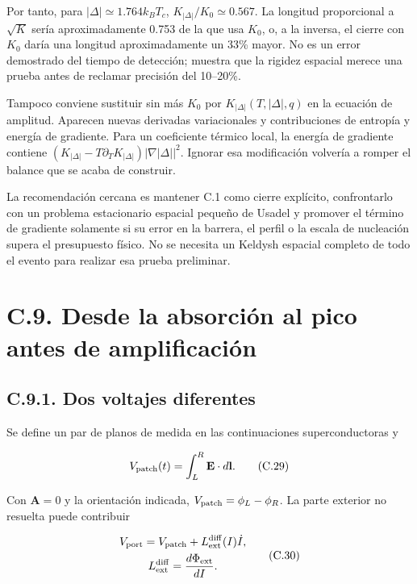 \documentclass[
  spanish,
  10pt,
  a4paper,
]{article}
\begin{document}
Por tanto, para \(|\Delta|\simeq1.764k_BT_c\),
\(K_{|\Delta|}/K_0\simeq0.567\). La longitud proporcional a \(\sqrt K\)
sería aproximadamente 0.753 de la que usa \(K_0\), o, a la inversa, el
cierre con \(K_0\) daría una longitud aproximadamente un 33\% mayor. No
es un error demostrado del tiempo de detección; muestra que la rigidez
espacial merece una prueba antes de reclamar precisión del 10--20\%.

Tampoco conviene sustituir sin más \(K_0\) por
\(K_{|\Delta|}(T,|\Delta|,q)\) en la ecuación de amplitud. Aparecen
nuevas derivadas variacionales y contribuciones de entropía y energía de
gradiente. Para un coeficiente térmico local, la energía de gradiente
contiene \((K_{|\Delta|}-T\partial_TK_{|\Delta|})|\nabla |\Delta||^2\).
Ignorar esa modificación volvería a romper el balance que se acaba de
construir.

La recomendación cercana es mantener C.1 como cierre explícito,
confrontarlo con un problema estacionario espacial pequeño de Usadel y
promover el término de gradiente solamente si su error en la barrera, el
perfil o la escala de nucleación supera el presupuesto físico. No se
necesita un Keldysh espacial completo de todo el evento para realizar
esa prueba preliminar.

\section{C.9. Desde la absorción al pico antes de
amplificación}\label{c.9.-desde-la-absorciuxf3n-al-pico-antes-de-amplificaciuxf3n}

\subsection{C.9.1. Dos voltajes
diferentes}\label{c.9.1.-dos-voltajes-diferentes}

Se define un par de planos de medida en las continuaciones
superconductoras y

\[
V_{\rm patch}(t)=\int_L^R\mathbf E\cdot d\mathbf l.
\tag{C.29}
\]

Con \(\mathbf A=0\) y la orientación indicada,
\(V_{\rm patch}=\phi_L-\phi_R\). La parte exterior no resuelta puede
contribuir

\[
\begin{gathered}
V_{\rm port}=V_{\rm patch}+L_{\rm ext}^{\rm diff}(I)\dot I,\\
L_{\rm ext}^{\rm diff}=\frac{d\Phi_{\rm ext}}{dI}.
\end{gathered} \tag{C.30}
\]
\end{document}
